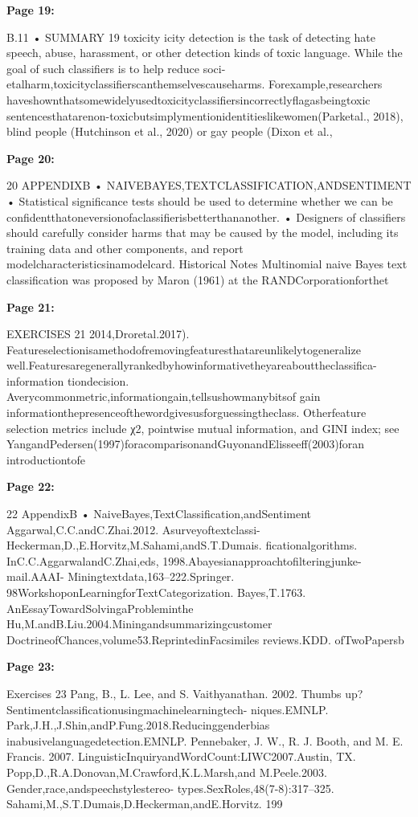 \documentclass[11pt,a4paper]{article}
\begin{document}
\textbf{Page 19:}

B.11 • SUMMARY 19
toxicity icity detection is the task of detecting hate speech, abuse, harassment, or other
detection
kinds of toxic language. While the goal of such classifiers is to help reduce soci-
etalharm,toxicityclassifierscanthemselvescauseharms. Forexample,researchers
haveshownthatsomewidelyusedtoxicityclassifiersincorrectlyflagasbeingtoxic
sentencesthatarenon-toxicbutsimplymentionidentitieslikewomen(Parketal.,
2018), blind people (Hutchinson et al., 2020) or gay people (Dixon et al., 

\textbf{Page 20:}

20 APPENDIXB • NAIVEBAYES,TEXTCLASSIFICATION,ANDSENTIMENT
• Statistical significance tests should be used to determine whether we can be
confidentthatoneversionofaclassifierisbetterthananother.
• Designers of classifiers should carefully consider harms that may be caused
by the model, including its training data and other components, and report
modelcharacteristicsinamodelcard.
Historical Notes
Multinomial naive Bayes text classification was proposed by Maron (1961) at the
RANDCorporationforthet

\textbf{Page 21:}

EXERCISES 21
2014,Droretal.2017).
Featureselectionisamethodofremovingfeaturesthatareunlikelytogeneralize
well.Featuresaregenerallyrankedbyhowinformativetheyareabouttheclassifica-
information tiondecision. Averycommonmetric,informationgain,tellsushowmanybitsof
gain
informationthepresenceofthewordgivesusforguessingtheclass. Otherfeature
selection metrics include χ2, pointwise mutual information, and GINI index; see
YangandPedersen(1997)foracomparisonandGuyonandElisseeff(2003)foran
introductiontofe

\textbf{Page 22:}

22 AppendixB • NaiveBayes,TextClassification,andSentiment
Aggarwal,C.C.andC.Zhai.2012. Asurveyoftextclassi- Heckerman,D.,E.Horvitz,M.Sahami,andS.T.Dumais.
ficationalgorithms. InC.C.AggarwalandC.Zhai,eds, 1998.Abayesianapproachtofilteringjunke-mail.AAAI-
Miningtextdata,163–222.Springer. 98WorkshoponLearningforTextCategorization.
Bayes,T.1763. AnEssayTowardSolvingaProbleminthe Hu,M.andB.Liu.2004.Miningandsummarizingcustomer
DoctrineofChances,volume53.ReprintedinFacsimiles reviews.KDD.
ofTwoPapersb

\textbf{Page 23:}

Exercises 23
Pang, B., L. Lee, and S. Vaithyanathan. 2002. Thumbs
up?Sentimentclassificationusingmachinelearningtech-
niques.EMNLP.
Park,J.H.,J.Shin,andP.Fung.2018.Reducinggenderbias
inabusivelanguagedetection.EMNLP.
Pennebaker, J. W., R. J. Booth, and M. E. Francis. 2007.
LinguisticInquiryandWordCount:LIWC2007.Austin,
TX.
Popp,D.,R.A.Donovan,M.Crawford,K.L.Marsh,and
M.Peele.2003. Gender,race,andspeechstylestereo-
types.SexRoles,48(7-8):317–325.
Sahami,M.,S.T.Dumais,D.Heckerman,andE.Horvitz.
199
\end{document}
